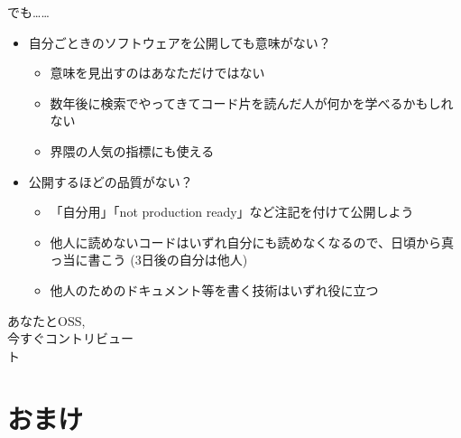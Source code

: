 \documentclass[
        unicode%
    ]{beamer}
\begin{document}
\begin{frame}{でも……}
    \begin{itemize}
        \pause
        \item 自分ごときのソフトウェアを公開しても意味がない？
            \begin{itemize}
                \pause
                \item 意味を見出すのはあなただけではない
                \item 数年後に検索でやってきてコード片を読んだ人が何かを学べるかもしれない
                \item 界隈の人気の指標にも使える
            \end{itemize}
        \pause
        \item 公開するほどの品質がない？
            \begin{itemize}
                \pause
                \item 「自分用」「not production ready」など注記を付けて公開しよう
                \item 他人に読めないコードはいずれ自分にも読めなくなるので、日頃から真っ当に書こう (3日後の自分は他人)
                \item 他人のためのドキュメント等を書く技術はいずれ役に立つ
            \end{itemize}
    \end{itemize}
\end{frame}

\begin{frame}{}
    \phantom{}
    {\Large\centering
        あなたとOSS,\\
        今すぐコントリビュー\\
        ト\\
    }
\end{frame}

\section*{おまけ}
\end{document}

